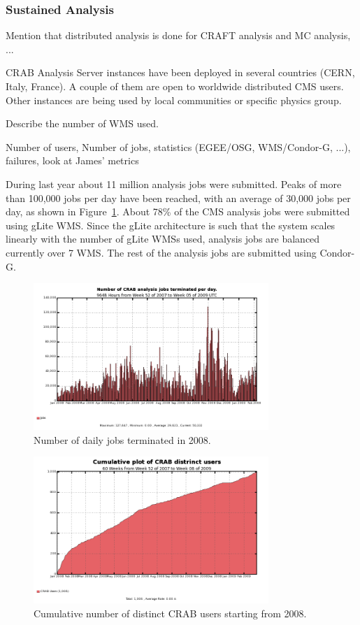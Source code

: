 \subsubsection{Sustained Analysis}
\label{sec:4_3_2}
Mention that distributed analysis is done for CRAFT analysis and MC analysis, ...

CRAB Analysis Server instances have been deployed in several countries (CERN, Italy, France).  
A couple of them are open to worldwide distributed CMS users. Other instances are being used by local communities or specific physics group.

Describe the number of WMS used.

Number of users, Number of jobs, statistics (EGEE/OSG, WMS/Condor-G, ...), failures, look
at James' metrics

During last year about 11 million analysis jobs were submitted.  Peaks
of more than 100,000 jobs per day have been reached, with an average
of 30,000 jobs per day, as shown in Figure~\ref{fig:jobs}.  About 78\% of
the CMS analysis jobs were submitted using gLite WMS.  Since the gLite
architecture is such that the system scales linearly with the number
of gLite WMSs used, analysis jobs are balanced currently over 7
WMS. The rest of the analysis jobs are submitted using Condor-G.
\begin{figure}
\includegraphics[width=3.5in]{figures/crabjobsdaily.png}
\caption{Number of daily jobs terminated in 2008. }
\label{fig:jobs}
\end{figure}
\begin{figure}
\includegraphics[width=3.5in]{figures/UserInteg.png}
\caption{Cumulative number of distinct CRAB users starting from 2008. }
\label{fig:intuser}
\end{figure}
